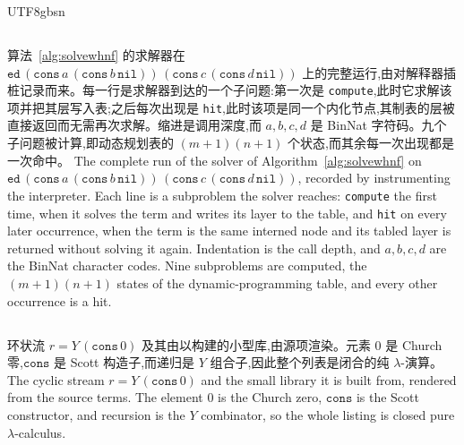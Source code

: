 \begin{CJK*}{UTF8}{gbsn}
  \subsection{}\label{app:editdistance-trace}
  \ifTablambdaChinese
  算法~\ref{alg:solvewhnf} 的求解器在 $\mathtt{ed}\,(\mathtt{cons}\,a\,(\mathtt{cons}\,b\,\mathtt{nil}))\,(\mathtt{cons}\,c\,(\mathtt{cons}\,d\,\mathtt{nil}))$ 上的完整运行,由对解释器插桩记录而来。每一行是求解器到达的一个子问题:第一次是 \texttt{compute},此时它求解该项并把其层写入表;之后每次出现是 \texttt{hit},此时该项是同一个内化节点,其制表的层被直接返回而无需再次求解。缩进是调用深度,而 $a,b,c,d$ 是 BinNat 字符码。九个子问题被计算,即动态规划表的 $(m{+}1)(n{+}1)$ 个状态,而其余每一次出现都是一次命中。
  \else
  The complete run of the solver of Algorithm~\ref{alg:solvewhnf} on $\mathtt{ed}\,(\mathtt{cons}\,a\,(\mathtt{cons}\,b\,\mathtt{nil}))\,(\mathtt{cons}\,c\,(\mathtt{cons}\,d\,\mathtt{nil}))$, recorded by instrumenting the interpreter. Each line is a subproblem the solver reaches: \texttt{compute} the first time, when it solves the term and writes its layer to the table, and \texttt{hit} on every later occurrence, when the term is the same interned node and its tabled layer is returned without solving it again. Indentation is the call depth, and $a,b,c,d$ are the BinNat character codes. Nine subproblems are computed, the $(m{+}1)(n{+}1)$ states of the dynamic-programming table, and every other occurrence is a hit.
  \fi
  

  \subsection{}\label{app:cyclic-zeros-code}
  \ifTablambdaChinese
  环状流 $r = Y\,(\mathtt{cons}\,0)$ 及其由以构建的小型库,由源项渲染。元素 $0$ 是 Church 零,$\mathtt{cons}$ 是 Scott 构造子,而递归是 $Y$ 组合子,因此整个列表是闭合的纯 $\lambda$-演算。
  \else
  The cyclic stream $r = Y\,(\mathtt{cons}\,0)$ and the small library it is built from, rendered from the source terms. The element $0$ is the Church zero, $\mathtt{cons}$ is the Scott constructor, and recursion is the $Y$ combinator, so the whole listing is closed pure $\lambda$-calculus.
  \fi
  


\end{CJK*}
